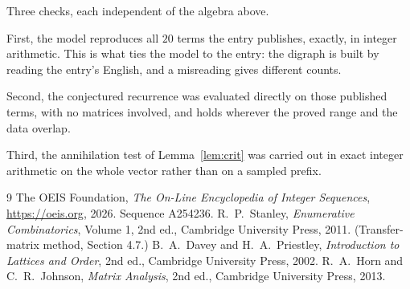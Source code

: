 \documentclass[11pt,a4paper]{article}
\theoremstyle{plain}
\theoremstyle{definition}
\begin{document}
Three checks, each independent of the algebra above.

First, the model reproduces all $20$ terms the entry publishes, exactly, in integer
arithmetic. This is what ties the model to the entry: the digraph is built by reading the
entry's English, and a misreading gives different counts.

Second, the conjectured recurrence was evaluated directly on those published terms, with no
matrices involved, and holds wherever the proved range and the data overlap.

Third, the annihilation test of Lemma~\ref{lem:crit} was carried out in exact integer
arithmetic on the whole vector rather than on a sampled prefix.

\begin{thebibliography}{9}
 The OEIS Foundation, \emph{The On-Line Encyclopedia of Integer
Sequences}, \url{https://oeis.org}, 2026. Sequence A254236.
 R.~P.~Stanley, \emph{Enumerative Combinatorics}, Volume 1, 2nd ed.,
Cambridge University Press, 2011. (Transfer-matrix method, Section 4.7.)
 B.~A.~Davey and H.~A.~Priestley, \emph{Introduction to Lattices and
Order}, 2nd ed., Cambridge University Press, 2002.
 R.~A.~Horn and C.~R.~Johnson, \emph{Matrix Analysis}, 2nd ed., Cambridge
University Press, 2013.
\end{thebibliography}
\end{document}
